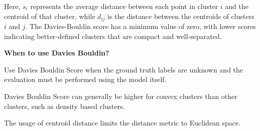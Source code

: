 
\begin{center}

\end{center}


Here, \( s_i \) represents the average distance between each point in cluster \( i \) and the centroid of that cluster, while \( d_{ij} \) is the distance between the centroids of clusters \( i \) and \( j \). The Davies-Bouldin score has a minimum value of zero, with lower scores indicating better-defined clusters that are compact and well-separated.

\textbf{When to use Davies Bouldin?}

Use Davies Bouldin Score when the ground truth labels are unknown and the evaluation must be performed using the model itself.

{
\item Davies Bouldin Score can generally be higher for convex clusters than other clusters, such as density based clusters.
\item The usage of centroid distance limits the distance metric to Euclidean space.
}

